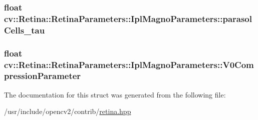 \hypertarget{structcv_1_1Retina_1_1RetinaParameters_1_1IplMagnoParameters_aa1cff23a59e2f8bc95dd9bb24e19a23e}{
\subsubsection[{parasol\-Cells\-\_\-tau}]{\setlength{\rightskip}{0pt plus 5cm}float cv\-::\-Retina\-::\-Retina\-Parameters\-::\-Ipl\-Magno\-Parameters\-::parasol\-Cells\-\_\-tau}}\label{structcv_1_1Retina_1_1RetinaParameters_1_1IplMagnoParameters_aa1cff23a59e2f8bc95dd9bb24e19a23e}
\hypertarget{structcv_1_1Retina_1_1RetinaParameters_1_1IplMagnoParameters_a868952919c5b08aad76c1da706888b7d}{
\subsubsection[{V0\-Compression\-Parameter}]{\setlength{\rightskip}{0pt plus 5cm}float cv\-::\-Retina\-::\-Retina\-Parameters\-::\-Ipl\-Magno\-Parameters\-::\-V0\-Compression\-Parameter}}\label{structcv_1_1Retina_1_1RetinaParameters_1_1IplMagnoParameters_a868952919c5b08aad76c1da706888b7d}


The documentation for this struct was generated from the following file\-:\begin{DoxyCompactItemize}
\item 
/usr/include/opencv2/contrib/\hyperlink{retina_8hpp}{retina.\-hpp}\end{DoxyCompactItemize}
